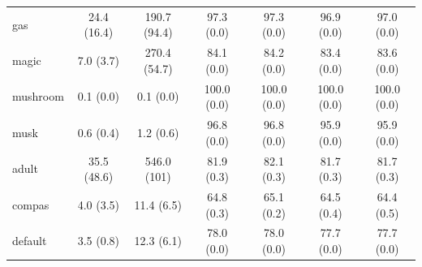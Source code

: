 \documentclass[twoside,11pt]{article}
\begin{document}
\begin{table}[h]
\begin{tabular}{l  c c c c c c }
gas & 24.4 (16.4) & 190.7 (94.4) & 97.3 (0.0) & 97.3 (0.0) & 96.9 (0.0) & 97.0 (0.0) \\
magic & 7.0 (3.7) & 270.4 (54.7) & 84.1 (0.0) & 84.2 (0.0) & 83.4 (0.0) & 83.6 (0.0) \\
mushroom & 0.1 (0.0) & 0.1 (0.0) & 100.0 (0.0) & 100.0 (0.0) & 100.0 (0.0) & 100.0 (0.0) \\
musk & 0.6 (0.4) & 1.2 (0.6) & 96.8 (0.0) & 96.8 (0.0) & 95.9 (0.0) & 95.9 (0.0) \\ \midrule
adult  &  35.5 (48.6) & 546.0 (101) & 81.9 (0.3) & 82.1 (0.3) & 81.7 (0.3)& 81.7 (0.3)\\
compas & 4.0 (3.5) & 11.4 (6.5)  & 64.8 (0.3) & 65.1 (0.2) &  64.5 (0.4) & 64.4 (0.5) \\
default &  3.5 (0.8) &  12.3 (6.1) &  78.0 (0.0) & 78.0 (0.0) & 77.7 (0.0) & 77.7 (0.0) \\
\bottomrule
\end{tabular}%
\end{table}%
\end{document}
